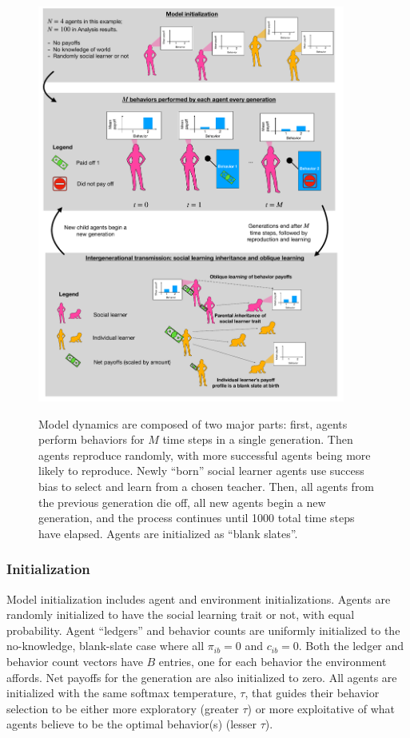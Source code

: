 \documentclass[letterpaper,11.5pt]{scrartcl}
\begin{document}
\begin{figure}
  \caption{Model dynamics are composed of two major parts: first, agents perform
  behaviors for $M$ time steps in a single generation. Then agents reproduce
  randomly, with more successful agents being more likely to reproduce. Newly
  ``born'' social learner agents use success bias to select and learn from a chosen
  teacher. Then, all agents from the previous generation die off, all new agents
  begin a new generation, and the process continues until 1000 total time steps
  have elapsed. Agents are initialized as ``blank slates''.}
  \centering
    \includegraphics[width=0.9\textwidth]{Figures/IntraInterGenerationalDynamics.pdf}
  \label{fig:IntraInterGenerationalDynamics}
\end{figure}


\subsubsection{Initialization}

Model initialization includes agent and environment initializations. Agents are
randomly initialized to have the social learning trait or not, with equal 
probability. Agent ``ledgers'' and behavior counts 
are uniformly initialized to the no-knowledge,
blank-slate case where all $\pi_{ib} = 0$ and $c_{ib} = 0$. Both the 
ledger and behavior count vectors have $B$ entries, one for each
behavior the environment affords. Net payoffs for
the generation are also initialized to zero. All agents are initialized with
the same softmax temperature, $\tau$, that guides their behavior selection 
to be either more exploratory (greater $\tau$) or more exploitative of
what agents believe to be the optimal behavior(s) (lesser $\tau$).
\end{document}
